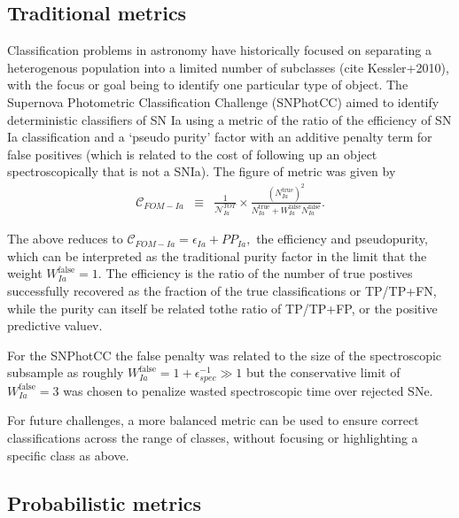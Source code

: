 \subsection{Traditional metrics}
\label{sec:past}

Classification problems in astronomy have historically focused on separating a heterogenous population into a limited number of subclasses (cite Kessler+2010), with the focus or goal being to identify one particular type of object.
The Supernova Photometric Classification Challenge (SNPhotCC) aimed to identify deterministic classifiers of SN Ia using a metric of the ratio of the efficiency of SN Ia classification and a `pseudo purity' factor with an additive penalty term for false positives (which is related to the cost of following up an object spectroscopically that is not a SNIa).
The figure of metric was given by
\begin{eqnarray}
  \label{eq:snphotcc}
  \mathcal{C}_{FOM-Ia} &\equiv& \frac{1}{\mathcal{N}_{Ia}^{TOT}}\times \frac{(N_{Ia}^{\mathrm{true}})^2}{N_{Ia}^\mathrm{true}+W_{Ia}^\mathrm{false}N_{Ia}^\mathrm{false}}.
\end{eqnarray}

The above reduces to $\mathcal{C}_{FOM-Ia}  = \epsilon_{Ia} + PP_{Ia},$ the efficiency and pseudopurity, which can be interpreted as the traditional purity factor in the limit that the weight $W_{Ia}^\mathrm{false} = 1$.
The efficiency is the ratio of the number of true postives successfully recovered as the fraction of the true classifications or TP/TP+FN, while the purity can itself be related tothe ratio of TP/TP+FP, or the positive predictive valuev.

For the SNPhotCC the false penalty was related to the size of the spectroscopic subsample as roughly $W_{Ia}^\mathrm{false} = 1 + \epsilon_{spec}^{-1} \gg 1$ but the conservative limit of $W_{Ia}^\mathrm{false} = 3$ was chosen to penalize wasted spectroscopic time over rejected SNe.

For future challenges, a more balanced metric can be used to ensure correct classifications across the range of classes, without focusing or highlighting a specific class as above.

\subsection{Probabilistic metrics}
\label{sec:metrics}

